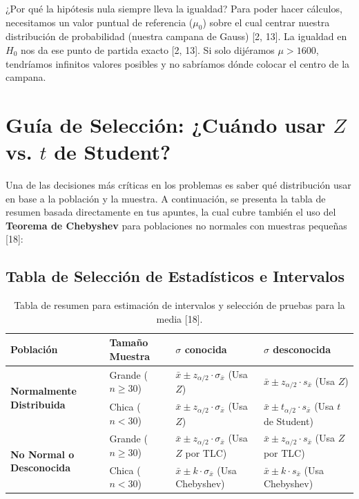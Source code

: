 \documentclass{article}
\begin{document}
\begin{didactico}{¿Por qué la hipótesis nula siempre lleva la igualdad?}
Para poder hacer cálculos, necesitamos un valor puntual de referencia ($\mu_0$) sobre el cual centrar nuestra distribución de probabilidad (nuestra campana de Gauss) [2, 13]. La igualdad en $H_0$ nos da ese punto de partida exacto [2, 13]. Si solo dijéramos $\mu > 1600$, tendríamos infinitos valores posibles y no sabríamos dónde colocar el centro de la campana.
\end{didactico}

\section{Guía de Selección: ¿Cuándo usar $Z$ vs. $t$ de Student?}

Una de las decisiones más críticas en los problemas es saber qué distribución usar en base a la población y la muestra. A continuación, se presenta la tabla de resumen basada directamente en tus apuntes, la cual cubre también el uso del \textbf{Teorema de Chebyshev} para poblaciones no normales con muestras pequeñas [18]:

\subsection{Tabla de Selección de Estadísticos e Intervalos}

\begin{table}[h!]
\centering
\small
\renewcommand{\arraystretch}{1.5}
\begin{tabular}{p{3cm} p{3.2cm} p{3.5cm} p{4cm}}
\toprule
\textbf{Población} & \textbf{Tamaño Muestra} & \textbf{$\sigma$ conocida} & \textbf{$\sigma$ desconocida} \\
\midrule
\multirow{2}{=}{\textbf{Normalmente Distribuida}} & Grande ($n \ge 30$) & $\bar{x} \pm z_{\alpha/2} \cdot \sigma_{\bar{x}}$ (Usa $Z$) & $\bar{x} \pm z_{\alpha/2} \cdot s_{\bar{x}}$ (Usa $Z$) \\
\cmidrule{2-4}
& Chica ($n < 30$) & $\bar{x} \pm z_{\alpha/2} \cdot \sigma_{\bar{x}}$ (Usa $Z$) & $\bar{x} \pm t_{\alpha/2} \cdot s_{\bar{x}}$ (Usa $t$ de Student) \\
\midrule
\multirow{2}{=}{\textbf{No Normal o Desconocida}} & Grande ($n \ge 30$) & $\bar{x} \pm z_{\alpha/2} \cdot \sigma_{\bar{x}}$ (Usa $Z$ por TLC) & $\bar{x} \pm z_{\alpha/2} \cdot s_{\bar{x}}$ (Usa $Z$ por TLC) \\
\cmidrule{2-4}
& Chica ($n < 30$) & $\bar{x} \pm k \cdot \sigma_{\bar{x}}$ (Usa Chebyshev) & $\bar{x} \pm k \cdot s_{\bar{x}}$ (Usa Chebyshev) \\
\bottomrule
\end{tabular}
\caption{Tabla de resumen para estimación de intervalos y selección de pruebas para la media [18].}
\end{table}
\end{document}
